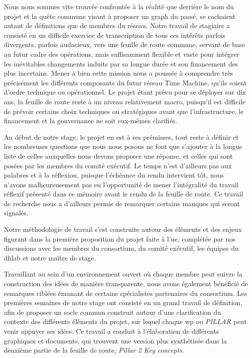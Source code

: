 Nous nous sommes vite trouvée confrontée à la réalité que derrière le nom du projet et la quête commune visant à proposer un \gls{graph} du passé, se cachaient autant de définitions que de membres du réseau. Notre travail de stagiaire a consisté en un difficile exercice de transcription de tous ces intérêts parfois divergents, parfois audacieux, vers une feuille de route commune, servant de base au futur cadre des opérations, mais suffisamment flexible et vaste pour intégrer les inévitables changements induits par sa longue durée et son financement des plus incertains. Mener à bien cette mission nous a poussée à comprendre très précisément les différents composants du futur réseau Time Machine, qu'ils soient d'ordre technique ou opérationnel. Le projet étant prévu pour se déployer sur dix ans, la feuille de route reste à un niveau relativement macro, puisqu'il est difficile de prévoir certains choix techniques ou stratégiques avant que l'infrastructure, le financement et la gouvernance ne soit eux-mêmes clarifiés.

Au début de notre stage, le projet en est à ses prémisses, tout reste à définir et les nombreuses questions que nous nous posons ne font que s'ajouter à la longue liste de celles auxquelles nous devons proposer une réponse, et celles qui sont posées par les membres du comité exécutif. Le temps n'est d'ailleurs pas aux palabres et à la réflexion, puisque l'échéance du rendu intervient tôt, nous n'avons malheureusement pas eu l'opportunité de mener l'intégralité du travail réflexif présenté dans ce mémoire avant le rendu de la feuille de route. Ce travail de recherche nous a d'ailleurs permis de remarquer certains manques qui seront signalés.

Notre méthodologie de travail s'est construite autour des éléments et des enjeux figurant dans la première proposition du projet faite à l'\gls{ue}, complétée par nos discussions avec les membres du consortium, du comité exécutif, les équipes du \gls{dhlab} et notre maître de stage. 

Travaillant au sein d'un environnement ouvert où chaque membre peut suivre la construction des idées de manière transparente, nous avons également bénéficié de remarques ciblées émanant de certains spécialistes partenaires du consortium.
Les premières semaines de notre stage ont consisté en un grand travail de définition, afin de proposer un socle commun construit autour d'une clarification du contexte des différents éléments du projet, sur lequel chaque \gls{wp} ou \textit{PILLAR} peut venir appuyer ses idées. Ce travail a conduit à l'élaboration de différents graphiques et documents, qui trouvent une version plus synthétisée dans la deuxième partie de la feuille de route, \textit{Pillar 2 Key concepts}. 

